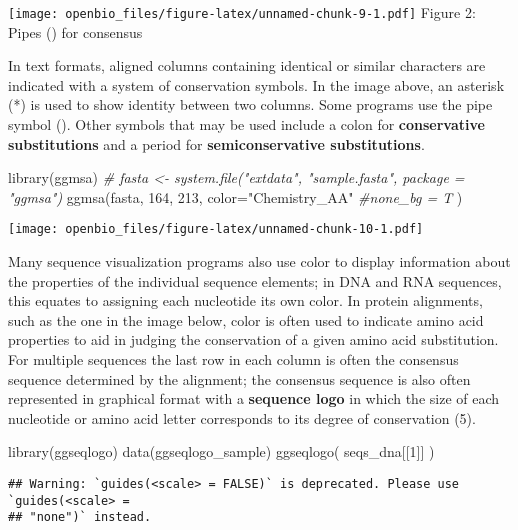 \documentclass[
]{book}
\newenvironment{Shaded}{\begin{snugshade}}{\end{snugshade}}
\newcommand{\AttributeTok}[1]{\textcolor[rgb]{0.77,0.63,0.00}{#1}}
\newcommand{\CommentTok}[1]{\textcolor[rgb]{0.56,0.35,0.01}{\textit{#1}}}
\newcommand{\DecValTok}[1]{\textcolor[rgb]{0.00,0.00,0.81}{#1}}
\newcommand{\FunctionTok}[1]{\textcolor[rgb]{0.00,0.00,0.00}{#1}}
\newcommand{\NormalTok}[1]{#1}
\newcommand{\StringTok}[1]{\textcolor[rgb]{0.31,0.60,0.02}{#1}}
\begin{document}
\texttt{[image: openbio\_files/figure-latex/unnamed-chunk-9-1.pdf]}
Figure 2: Pipes (\textbar) for consensus

In text formats, aligned columns containing identical or similar characters are indicated with a system of conservation symbols. In the image above, an asterisk (*) is used to show identity between two columns. Some programs use the pipe symbol (\textbar). Other symbols that may be used include a colon for \textbf{conservative substitutions} and a period for \textbf{semiconservative substitutions}.

\begin{Shaded}
\begin{Highlighting}[]
\FunctionTok{library}\NormalTok{(ggmsa)}
\CommentTok{\# fasta \textless{}{-} system.file("extdata", "sample.fasta", package = "ggmsa")}
\FunctionTok{ggmsa}\NormalTok{(fasta, }\DecValTok{164}\NormalTok{, }\DecValTok{213}\NormalTok{, }\AttributeTok{color=}\StringTok{"Chemistry\_AA"}
      \CommentTok{\#none\_bg = T}
\NormalTok{      )}
\end{Highlighting}
\end{Shaded}

\texttt{[image: openbio\_files/figure-latex/unnamed-chunk-10-1.pdf]}

Many sequence visualization programs also use color to display information about the properties of the individual sequence elements; in DNA and RNA sequences, this equates to assigning each nucleotide its own color. In protein alignments, such as the one in the image below, color is often used to indicate amino acid properties to aid in judging the conservation of a given amino acid substitution. For multiple sequences the last row in each column is often the consensus sequence determined by the alignment; the consensus sequence is also often represented in graphical format with a \textbf{sequence logo} in which the size of each nucleotide or amino acid letter corresponds to its degree of conservation (5).

\begin{Shaded}
\begin{Highlighting}[]
\FunctionTok{library}\NormalTok{(ggseqlogo)}
\FunctionTok{data}\NormalTok{(ggseqlogo\_sample)}
\FunctionTok{ggseqlogo}\NormalTok{( seqs\_dna[[}\DecValTok{1}\NormalTok{]] )}
\end{Highlighting}
\end{Shaded}

\begin{verbatim}
## Warning: `guides(<scale> = FALSE)` is deprecated. Please use `guides(<scale> =
## "none")` instead.
\end{verbatim}
\end{document}
